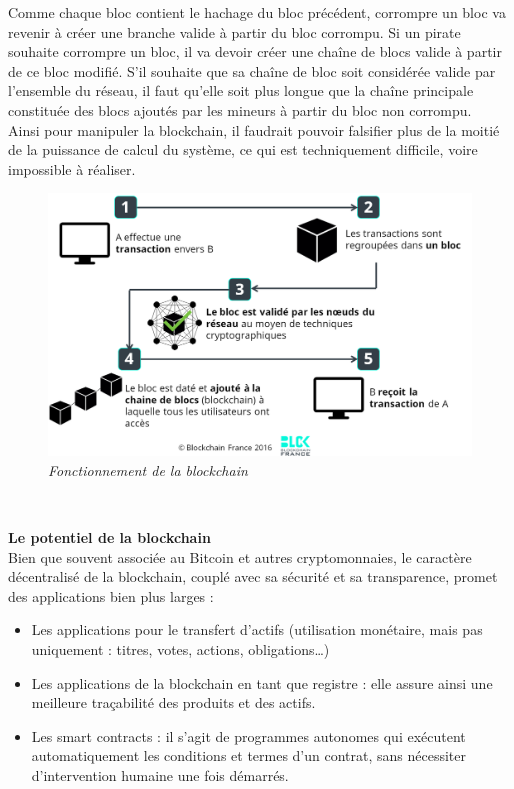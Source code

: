 \documentclass[conference]{IEEEtran}
\begin{document}
Comme chaque bloc contient le hachage du bloc précédent, corrompre un bloc va revenir à créer une branche valide à partir du bloc corrompu. 
Si un pirate souhaite corrompre un bloc, il va devoir créer une chaîne de blocs valide à partir de ce bloc modifié. S'il souhaite que sa chaîne de bloc soit considérée valide par l'ensemble du réseau, il faut qu'elle soit plus longue que la chaîne principale constituée des blocs ajoutés par les mineurs à partir du bloc non corrompu.\\
Ainsi pour manipuler la blockchain, il faudrait pouvoir falsifier plus de la moitié de la puissance de calcul du système, ce qui est techniquement difficile, voire impossible à réaliser. \vspace{0.15cm}

\begin{figure}[!h]
    \centering
    \includegraphics[scale=0.3]{blck-fonctionnement.png}
    \caption{\textit{Fonctionnement de la blockchain} \cite{bcfr}}
    \label{fig:blck-fonctionnement}
\end{figure}
\vspace{0.3cm}\\

\newpage

\textbf{Le potentiel de la blockchain} \cite{bcfr}\\

Bien que souvent associée au Bitcoin et autres cryptomonnaies, le caractère décentralisé de la blockchain, couplé avec sa sécurité et sa transparence, promet des applications bien plus larges : 
\begin{itemize}
    \item Les applications pour le transfert d’actifs (utilisation monétaire, mais pas uniquement : titres, votes, actions, obligations…)
    \item Les applications de la blockchain en tant que registre : elle assure ainsi une meilleure traçabilité des produits et des actifs.
    \item Les smart contracts : il s’agit de programmes autonomes qui exécutent automatiquement les conditions et termes d’un contrat, sans nécessiter d’intervention humaine une fois démarrés. 
\end{itemize} 
\end{document}
